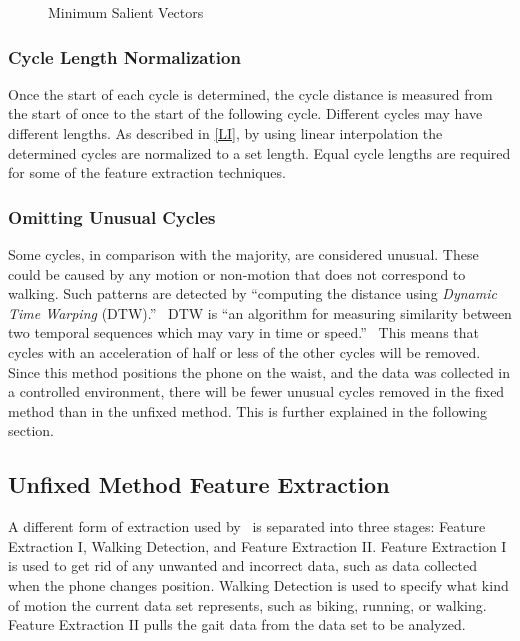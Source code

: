 \documentclass{sig-alternate}
\begin{document}
\begin{figure*}
\centering
{}
\caption{Minimum Salient Vectors}
\label{fig:AccelChart}
\end{figure*}

			
\subsubsection{Cycle Length Normalization}
Once the start of each cycle is determined, the cycle distance is measured from the start of once to the start of the following cycle. Different cycles may have different lengths. As described in \ref{LI}, by using linear interpolation the determined cycles are normalized to a set length. Equal cycle lengths are required for some of the feature extraction techniques. 
			
\subsubsection{Omitting Unusual Cycles}
Some cycles, in comparison with the majority, are considered unusual. These could be caused by any motion or non-motion that does not correspond to walking. Such patterns are detected by ``computing the distance using \textit{Dynamic Time Warping} (DTW).''~\cite{Muaaz:2013} DTW is ``an algorithm for measuring similarity between two temporal sequences which may vary in time or speed.''~\cite{wiki2:2014} This means that cycles with an acceleration of half or less of the other cycles will be removed. Since this method positions the phone on the waist, and the data was collected in a controlled environment, there will be fewer unusual cycles removed in the fixed method than in the unfixed method. This is further explained in the following section.

\subsection{Unfixed Method Feature Extraction}
	A different form of extraction used by~\cite{Lu:2014} is separated into three stages: Feature Extraction I, Walking Detection, and Feature Extraction II. Feature Extraction I is used to get rid of any unwanted and incorrect data, such as data collected when the phone changes position. Walking Detection is used to specify what kind of motion the current data set represents, such as biking, running, or walking. Feature Extraction II pulls the gait data from the data set to be analyzed. 
\end{document}
